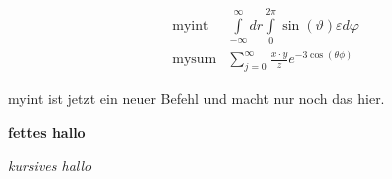 \documentclass[12pt, a4paper, twopage]{scrartcl}
\begin{document}
\begin{appendix}
\newcommand{\myint}{\int\limits_{-\infty}^{\infty} dr \int\limits_{0}^{2 \pi} \sin(\vartheta) \varepsilon d\varphi}

\newcommand{\mysum}[3]{\sum\limits_{j = 0}^{\infty} \frac{#1\cdot #2}{#3} e^{- 3 \cos(\theta \phi)}}

\begin{align*}
  &\text{myint} & \myint\\
  &\text{mysum} & \mysum{x}{y}{z}
\end{align*}

\renewcommand{\myint}{myint ist jetzt ein neuer Befehl und macht nur noch das hier.}

\myint

\vspace{2cm}
\newcommand{\fett}[1]{{\bf #1}}

\fett{fettes hallo}

\newcommand{\kursiv}[1]{{\it #1}}

\kursiv{kursives hallo}



\end{appendix}
\end{document}
